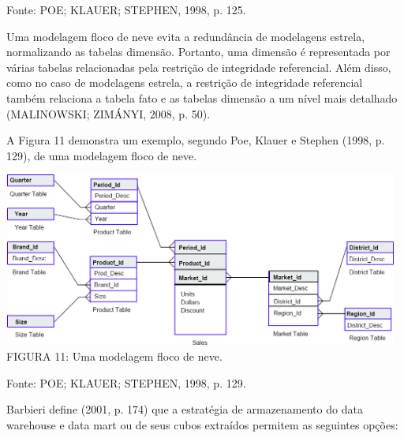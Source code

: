 \documentclass[a4paper]{article}
\begin{document}
{\sffamily
Fonte: POE; KLAUER; STEPHEN, 1998, p. 125. }

{
\textsf{Uma modelagem floco de neve evita a redund\^ancia de modelagens estrela, normalizando as tabelas dimens\~ao.
Portanto, uma dimens\~ao \'e representada por v\'arias tabelas relacionadas pela restri\c{c}\~ao de integridade
referencial. Al\'em disso, como no caso de modelagens estrela, a restri\c{c}\~ao de integridade referencial tamb\'em
relaciona a tabela fato e as tabelas dimens\~ao a um n\'ivel mais detalhado (MALINOWSKI; ZIM\'ANYI, 2008, p. 50). }}

{
\textsf{A Figura 11 demonstra um exemplo, segundo Poe, Klauer e Stephen (1998, p. 129), de uma modelagem floco de
neve.}}


\bigskip

{
 \includegraphics[width=13.012cm,height=5.715cm]{monograph-img011.jpg} \textsf{\MakeUppercase{ \newline
FIGURA }}\textsf{11: Uma modelagem floco de neve. }}

{\sffamily
Fonte: POE; KLAUER; STEPHEN, 1998, p. 129. }

{\sffamily
Barbieri define (2001, p. 174) que a estrat\'egia de armazenamento do data warehouse e data mart ou de seus cubos
extra\'idos permitem as seguintes op\c{c}\~oes:}
\end{document}
